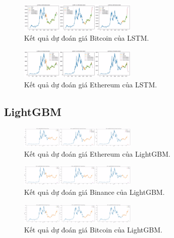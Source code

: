 \documentclass{ieeeojies}
\begin{document}
\begin{figure}[h]
    \centering
    \includegraphics[width=0.5\textwidth]{bibliography/pictures/LSTM BTC.jpg}
    \caption{Kết quả dự đoán giá Bitcoin của LSTM.}
\end{figure}

\begin{figure}[h]
    \centering
    \includegraphics[width=0.5\textwidth]{bibliography/pictures/LSTM ETH.jpg}
    \caption{Kết quả dự đoán giá Ethereum của LSTM.}
\end{figure}
\subsection{LightGBM}
\begin{figure}[h]
    \centering
    \includegraphics[width=0.5\textwidth]{bibliography/pictures/LIGHTGBM ETH.jpg}
    \caption{Kết quả dự đoán giá Ethereum của LightGBM.}
\end{figure}
\begin{figure}[h]
    \centering
    \includegraphics[width=0.5\textwidth]{bibliography/pictures/LIGHTGBM bnb.jpg}
    \caption{Kết quả dự đoán giá Binance của LightGBM.}
\end{figure}
\begin{figure}[h]
    \centering
    \includegraphics[width=0.5\textwidth]{bibliography/pictures/LIGHTGBM BTC.jpg}
    \caption{Kết quả dự đoán giá Bitcoin của LightGBM.}
\end{figure}
\end{document}
